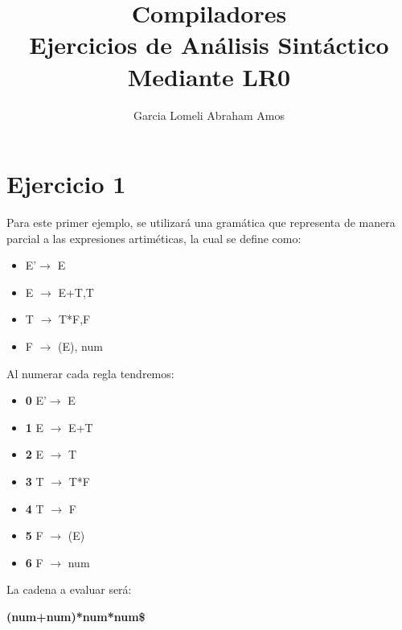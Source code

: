 \documentclass[11pt,a4paper]{article}
\author{Garcia Lomeli Abraham Amos}
\title{Compiladores\\Ejercicios de Análisis Sintáctico Mediante LR0}
\begin{document}
\maketitle
\tableofcontents
\section{Ejercicio 1}
Para este primer ejemplo, se utilizará una gramática que representa de manera parcial a las expresiones artiméticas, la cual se define como:

\begin{itemize}
\item E'$\longrightarrow$ E
\item E $\longrightarrow$ E+T,T
\item T $\longrightarrow$ T*F,F
\item F $\longrightarrow$ (E), num

\end{itemize}

Al numerar cada regla tendremos:

\begin{itemize}
\item \textbf{0} E'$\longrightarrow$ E
\item \textbf{1} E $\longrightarrow$ E+T
\item \textbf{2} E $\longrightarrow$ T
\item \textbf{3} T $\longrightarrow$ T*F
\item \textbf{4} T $\longrightarrow$ F
\item \textbf{5} F $\longrightarrow$ (E)
\item \textbf{6} F $\longrightarrow$ num
\end{itemize}


La cadena a evaluar será:
\begin{center}
\textbf{(num+num)*num*num\$}
\end{center}
\newpage
\end{document}

